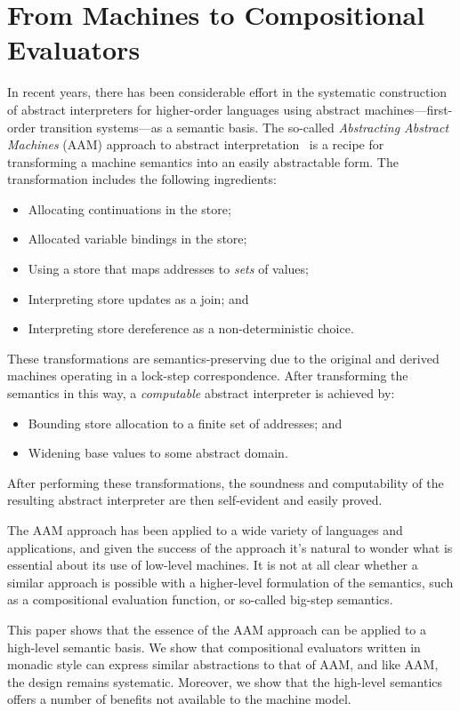 \section{From Machines to Compositional Evaluators}

In recent years, there has been considerable effort in the systematic
construction of abstract interpreters for higher-order languages using abstract
machines---first-order transition systems---as a semantic basis.  The so-called
\emph{Abstracting Abstract Machines} (AAM) approach to abstract
interpretation~\cite{dvanhorn:VanHorn2010Abstracting} is a recipe for
transforming a machine semantics into an easily abstractable form. The
transformation includes the following ingredients:
\begin{itemize}
\item Allocating continuations in the store;
\item Allocated variable bindings in the store;
\item Using a store that maps addresses to \emph{sets} of values;
\item Interpreting store updates as a join; and
\item Interpreting store dereference as a non-deterministic choice.
\end{itemize}
These transformations are semantics-preserving due to the original and derived
machines operating in a lock-step correspondence.  After transforming the
semantics in this way, a \emph{computable} abstract interpreter is achieved by:
\begin{itemize}
\item Bounding store allocation to a finite set of addresses; and
\item Widening base values to some abstract domain.
\end{itemize}
After performing these transformations, the soundness and computability of the
resulting abstract interpreter are then self-evident and easily proved.

The AAM approach has been applied to a wide variety of languages and
applications, and given the success of the approach it's natural to wonder what
is essential about its use of low-level machines. It is not at all clear
whether a similar approach is possible with a higher-level formulation of the
semantics, such as a compositional evaluation function, or so-called big-step
semantics.

This paper shows that the essence of the AAM approach can be applied to a
high-level semantic basis.  We show that compositional evaluators written in
monadic style can express similar abstractions to that of AAM, and like AAM,
the design remains systematic.  Moreover, we show that the high-level semantics
offers a number of benefits not available to the machine model.  

